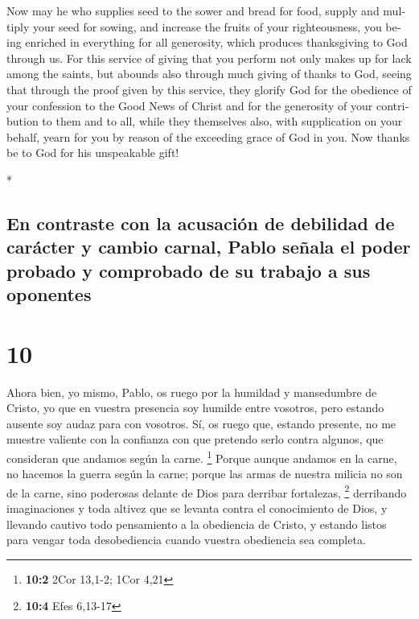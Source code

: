 \begin{paracol}{2}
\begin{otherlanguage}{english}
 Now may he who supplies seed to the sower and bread for
food, supply and multiply your seed for sowing, and increase the fruits
of your righteousness,  you being enriched in everything
for all generosity, which produces thanksgiving to God through us.
 For this service of giving that you perform not only
makes up for lack among the saints, but abounds also through much giving
of thanks to God,  seeing that through the proof given by
this service, they glorify God for the obedience of your confession to
the Good News of Christ and for the generosity of your contribution to
them and to all,  while they themselves also, with
supplication on your behalf, yearn for you by reason of the exceeding
grace of God in you.  Now thanks be to God for his
unspeakable gift!

\end{otherlanguage}

\switchcolumn[0]*

\hypertarget{en-contraste-con-la-acusaciuxf3n-de-debilidad-de-caruxe1cter-y-cambio-carnal-pablo-seuxf1ala-el-poder-probado-y-comprobado-de-su-trabajo-a-sus-oponentes}{%
\subsection{En contraste con la acusación de debilidad de carácter y
cambio carnal, Pablo señala el poder probado y comprobado de su trabajo
a sus
oponentes}\label{en-contraste-con-la-acusaciuxf3n-de-debilidad-de-caruxe1cter-y-cambio-carnal-pablo-seuxf1ala-el-poder-probado-y-comprobado-de-su-trabajo-a-sus-oponentes}}

\hypertarget{section-18}{%
\section{10}\label{section-18}}

 Ahora bien, yo mismo, Pablo, os ruego por la humildad y
mansedumbre de Cristo, yo que en vuestra presencia soy humilde entre
vosotros, pero estando ausente soy audaz para con vosotros.
 Sí, os ruego que, estando presente, no me muestre
valiente con la confianza con que pretendo serlo contra algunos, que
consideran que andamos según la carne. \footnote{\textbf{10:2} 2Cor
  13,1-2; 1Cor 4,21}  Porque aunque andamos en la carne,
no hacemos la guerra según la carne;  porque las armas de
nuestra milicia no son de la carne, sino poderosas delante de Dios para
derribar fortalezas, \footnote{\textbf{10:4} Efes 6,13-17}
 derribando imaginaciones y toda altivez que se levanta
contra el conocimiento de Dios, y llevando cautivo todo pensamiento a la
obediencia de Cristo,  y estando listos para vengar toda
desobediencia cuando vuestra obediencia sea completa.


\end{paracol}
